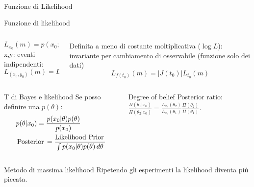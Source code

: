 \documentclass[asd-beamer.tex]{subfiles}
\begin{document}
\begin{frame}{Funzione di Likelihood}\frameintoc
\begin{block}{Funzione di likelihood}
\begin{columns}[T]
	\begin{column}{0.5\textwidth}
		\[L_{x_0}(m)=p(x_0;m)\]
		x,y: eventi indipendenti:
		\[L_{(x_0,y_0)}(m)=L_{x_0}(m)L_{y_0}(m)\]
	\end{column}
	\begin{column}{0.5\textwidth}
		Definita a meno di costante moltiplicativa ($\log{L}$): invariante per cambiamento di osservabile (funzione solo dei dati)
		\[L_{f(t_0)}(m)=|J(t_0)|L_{t_0}(m)\]
	\end{column}
\end{columns}
\end{block}
\begin{columns}[T]
\begin{column}{0.5\textwidth}
	\begin{block}{T di Bayes e likelihood}
		Se posso definire una $p(\theta)$:
		\begin{align*}
		&p(\theta|x_0)=\frac{p(x_0|\theta)p(\theta)}{p(x_0)}\\
		&\operatorname{Posterior}{}=\frac{\operatorname{Likelihood}{}\operatorname{Prior}{}}{\int p(x_0|\theta)p(\theta)\,d\theta}
		\end{align*}
	\end{block}
\end{column}
\begin{column}{0.5\textwidth}
	\begin{block}{Degree of belief}
		Posterior ratio: $\frac{\Pi(\theta_1|x_0)}{\Pi(\theta_2|x_0)}=\frac{L_{x_0}(\theta_2)}{L_{x_0}(\theta_1)}\frac{\Pi(\theta_2)}{\Pi(\theta_1)}$.
	\end{block}
\end{column}
\end{columns}
\begin{block}{Metodo di massima likelihood}
Ripetendo gli esperimenti la likelihood diventa pi\'u piccata.
\end{block}
\end{frame}
\end{document}
